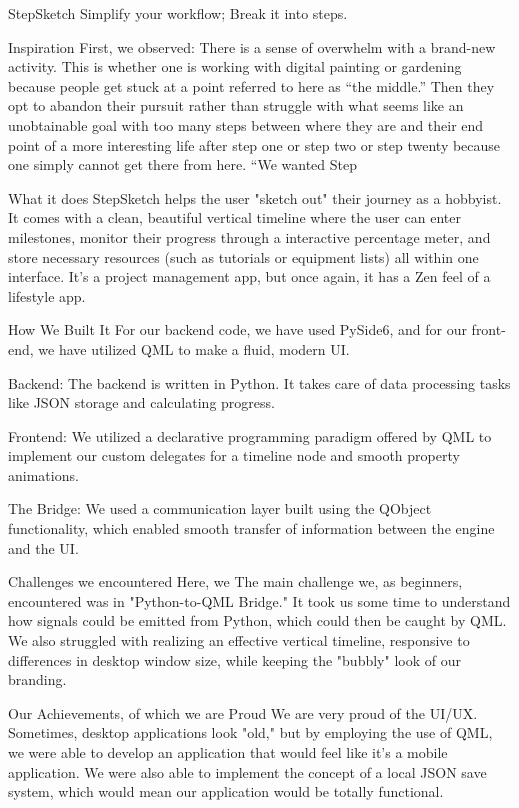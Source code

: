 StepSketch
Simplify your workflow; Break it into steps.

Inspiration
First, we observed: There is a sense of overwhelm with a brand-new activity. This is whether one is working with digital painting or gardening because people get stuck at a point referred to here as “the middle.” Then they opt to abandon their pursuit rather than struggle with what seems like an unobtainable goal with too many steps between where they are and their end point of a more interesting life after step one or step two or step twenty because one simply cannot get there from here. “We wanted Step

What it does
StepSketch helps the user "sketch out" their journey as a hobbyist. It comes with a clean, beautiful vertical timeline where the user can enter milestones, monitor their progress through a interactive percentage meter, and store necessary resources (such as tutorials or equipment lists) all within one interface. It’s a project management app, but once again, it has a Zen feel of a lifestyle app.

How We Built It
For our backend code, we have used PySide6, and for our front-end, we have utilized QML to make a fluid, modern UI.

Backend: The backend is written in Python. It takes care of data processing tasks like JSON storage and calculating progress.

Frontend: We utilized a declarative programming paradigm offered by QML to implement our custom delegates for a timeline node and smooth property animations.

The Bridge: We used a communication layer built using the QObject functionality, which enabled smooth transfer of information between the engine and the UI.

Challenges we encountered
Here, we The main challenge we, as beginners, encountered was in "Python-to-QML Bridge." It took us some time to understand how signals could be emitted from Python, which could then be caught by QML. We also struggled with realizing an effective vertical timeline, responsive to differences in desktop window size, while keeping the "bubbly" look of our branding.

Our Achievements, of which we are Proud
We are very proud of the UI/UX. Sometimes, desktop applications look "old," but by employing the use of QML, we were able to develop an application that would feel like it’s a mobile application. We were also able to implement the concept of a local JSON save system, which would mean our application would be totally functional.

